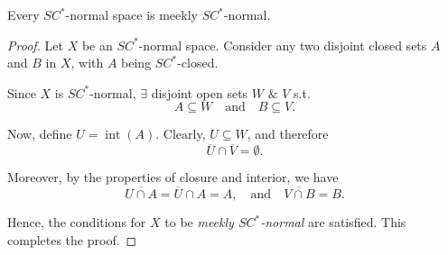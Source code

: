 \documentclass[10pt,a4paper]{amsart}
\begin{document}
\begin{theorem}\label{thm:1.5.3}
Every $SC^*$-normal space is meekly $SC^*$-normal.
\end{theorem}

\begin{proof}
Let $X$ be an $SC^*$-normal space. Consider any two disjoint closed sets $A$ and $B$ in $X$, with $A$ being $SC^*$-closed.  

Since $X$ is $SC^*$-normal, $\exists$ disjoint open sets $W$ $\&$ $V$ s.t.
\[
A \subseteq W \quad \text{and} \quad B \subseteq V.
\]

Now, define $U = \operatorname{int}(A)$. Clearly, $U \subseteq W$, and therefore
\[
\overline{U} \cap \overline{V} = \emptyset.
\]

Moreover, by the properties of closure and interior, we have
\[
\overline{U \cap A} = \overline{U} \cap A = A, \quad \text{and} \quad \overline{V \cap B} = B.
\]

Hence, the conditions for $X$ to be \emph{meekly $SC^*$-normal} are satisfied. This completes the proof.
\end{proof}
\end{document}
